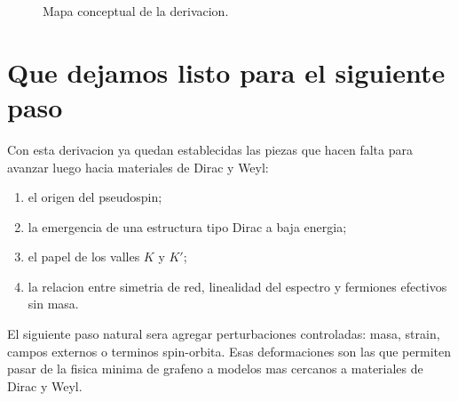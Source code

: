 \begin{figure}[ht]
\centering
{}
\caption{Mapa conceptual de la derivacion.}
\label{c02:fig:flow}
\end{figure}

\section{Que dejamos listo para el siguiente paso}

Con esta derivacion ya quedan establecidas las piezas que hacen falta para avanzar luego hacia materiales de Dirac y Weyl:

\begin{enumerate}[leftmargin=*]
  \item el origen del pseudospin;
  \item la emergencia de una estructura tipo Dirac a baja energia;
  \item el papel de los valles \(K\) y \(K'\);
  \item la relacion entre simetria de red, linealidad del espectro y fermiones efectivos sin masa.
\end{enumerate}

El siguiente paso natural sera agregar perturbaciones controladas: masa, strain, campos externos o terminos spin-orbita. Esas deformaciones son las que permiten pasar de la fisica minima de grafeno a modelos mas cercanos a materiales de Dirac y Weyl.

